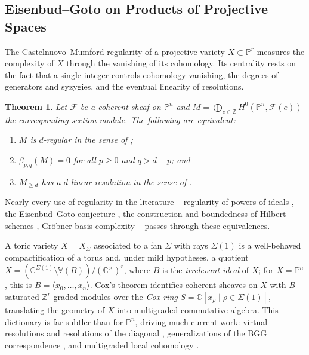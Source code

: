 \documentclass[11pt,reqno]{amsart}
\newtheorem{theorem}[lemma]{Theorem}
\theoremstyle{remark}
\newcommand{\CC}{\mathbb{C}}
\newcommand{\PP}{\mathbb{P}}
\newcommand{\VV}{\mathbb{V}}
\newcommand{\ZZ}{\mathbb{Z}}
\newcommand{\cF}{\mathcal{F}}
\begin{document}
\subsection{Eisenbud--Goto on Products of Projective Spaces}\label{subsec:prior:homological-algebra-on-toric}

The Castelnuovo--Mumford regularity of a projective variety $X\subset \PP^{r}$ measures the complexity of $X$ through the vanishing of its cohomology. Its centrality rests on the fact that a single integer controls cohomology vanishing, the degrees of generators and syzygies, and the eventual linearity of resolutions.

\begin{theorem}\cite{eisenbudGoto84}\label{thm:eisenbud-goto}
Let $\cF$ be a coherent sheaf on $\PP^{n}$ and $M=\bigoplus_{e\in\ZZ} H^0(\PP^{n},\cF(e))$ the corresponding section module. The following are equivalent:
\begin{enumerate}
\item $M$ is $d$-regular in the sense of \cite[Lect.~14]{mumford66};
\item $\beta_{p,q}(M)=0$ for all $p\geq0$ and $q>d+p$; and
\item $M_{\geq d}$ has a $d$-linear resolution in the sense of \cite{eisenbudGoto84}.
\end{enumerate}
\end{theorem}

Nearly every use of regularity in the literature -- regularity of powers of ideals \cite{CHT99,Kodiyalam00}, the Eisenbud--Goto conjecture \cite{MP18}, the construction and boundedness of Hilbert schemes \cite{grothendieck61,gotzmann78}, Gr\"obner basis complexity \cite{bayerStillman87} -- passes through these equivalences.

A toric variety $X=X_\Sigma$ associated to a fan $\Sigma$ with rays $\Sigma(1)$ is a well-behaved compactification of a torus and, under mild hypotheses, a quotient $X=(\CC^{\Sigma(1)}\setminus \VV(B))/(\CC^{\times})^r$, where $B$ is the \emph{irrelevant ideal} of $X$; for $X = \PP^{n}$, this is $B=\langle x_0,\ldots,x_{n}\rangle$. Cox's theorem \cite{cox95} identifies coherent sheaves on $X$ with $B$-saturated $\ZZ^r$-graded modules over the \emph{Cox ring} $S=\CC[x_\rho \mid \rho\in\Sigma(1)]$, translating the geometry of $X$ into multigraded commutative algebra. This dictionary is far subtler than for $\PP^n$, driving much current work: virtual resolutions and resolutions of the diagonal \cite{BES20, HHL24, brownErman24-1, faveroHuang23}, generalizations of the BGG correspondence \cite{EES15,brownErmanTate}, and multigraded local cohomology \cite{botbolChardin17, chardinNemati20}.
\end{document}
